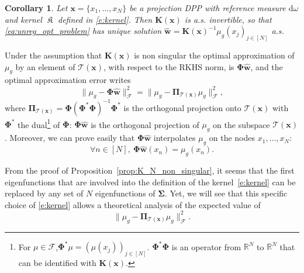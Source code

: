 \documentclass[twoside,11pt]{book}
\newtheorem{corollary}{Corollary}
\DeclareMathOperator*{\KDPP}{\mathfrak{K}}
\begin{document}
\begin{corollary}
  Let $\bm{x} = \{x_{1}, \dots , x_{N}\}$ be a projection DPP with reference measure $\mathrm{d}\omega$ and kernel $\KDPP$ defined in \eqref{e:kernel}. Then $\bm{K}(\bm{x})$ is a.s. invertible, so that \eqref{eq:unreg_opt_problem} has unique solution $\hat{\bm{w}} = \bm{K}(\bm{x})^{-1}\mu_{g}(x_{j})_{j \in [N]}$ a.s.
\label{c:regularization}
\end{corollary}

 Under the assumption that $\bm{K}(\bm{x})$ is non singular the optimal approximation of $\mu_{g}$ by an element of $\mathcal{T}(\bm{x})$, with respect to the RKHS norm, is $\bm{\Phi}\hat{\bm{w}}$, and the optimal approximation error writes
\begin{equation}
\|\mu_{g} - \bm{\Phi}\hat{\bm{w}}\|^{2}_{\mathcal{F}} =\|\mu_{g} - \bm{\Pi}_{\mathcal{T}(\bm{x})}\mu_{g}\|^{2}_{\mathcal{F}},\label{e:finalTool}
\end{equation}
where $\bm{\Pi}_{\mathcal{T}(\bm{x})} = \bm{\Phi}(\bm{\Phi}^{*}\bm{\Phi})^{-1}\bm{\Phi}^{*}$ is the orthogonal projection onto $\mathcal{T}(\bm{x})$ with $\bm{\Phi}^{*}$ the dual\footnote{For $\mu \in \mathcal{F}$,$\bm{\Phi}^{*}\mu = (\mu(x_{j}))_{j \in [N]}$. $\bm{\Phi}^{*}\bm{\Phi}$ is an operator from $\mathbb{R}^{N}$ to $\mathbb{R}^{N}$ that can be identified with $\bm{K}(\bm{x})$.} of $\bm{\Phi}$: $\bm{\Phi}\hat{\bm{w}}$ is the orthogonal projection of $\mu_{g}$ on the subspace $\mathcal{T}(\bm{x})$. Moreover, we can prove easily that $\bm{\Phi}\hat{\bm{w}}$ interpolates $\mu_{g}$ on the nodes $x_{1}, \dots, x_{N}$:
\begin{equation}
\forall n \in [N], \:\bm{\Phi}\hat{\bm{w}}(x_{n}) = \mu_{g}(x_{n}).
\end{equation}

From the proof of Proposition~\ref{prop:K_N_non_singular}, it seems that the first eigenfunctions that are involved into the definition of the kernel~\eqref{e:kernel}
 can be replaced by any set of $N$ eigenfunctions of $\bm{\Sigma}$. Yet, we will see that this specific choice of \eqref{e:kernel} allows a theoretical analysis of the expected value of 
 \begin{equation}
 \|\mu_{g} - \bm{\Pi}_{\mathcal{T}(\bm{x})} \mu_{g}\|_{\mathcal{F}}^{2}.
 \end{equation}
\end{document}
